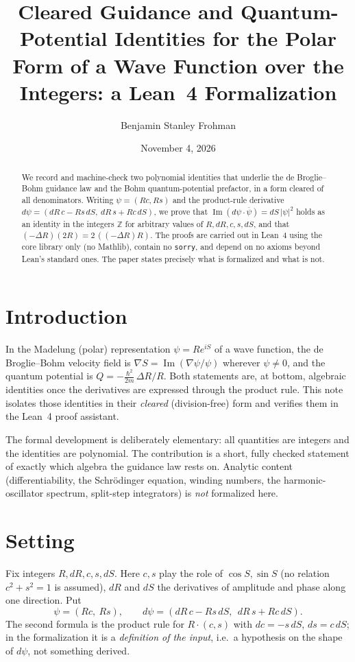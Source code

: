 \documentclass[11pt]{amsart}
\title[Cleared Madelung identities in Lean 4]{Cleared Guidance and Quantum-Potential Identities for the Polar Form of a Wave Function over the Integers: a Lean~4 Formalization}
\author{Benjamin Stanley Frohman}
\date{November 4, 2026}
\theoremstyle{definition}
\theoremstyle{remark}
\begin{document}
\begin{abstract}
We record and machine-check two polynomial identities that underlie the de Broglie--Bohm guidance law and the Bohm quantum-potential prefactor, in a form cleared of all denominators. Writing $\psi=(Rc,Rs)$ and the product-rule derivative $d\psi=(dR\,c-Rs\,dS,\ dR\,s+Rc\,dS)$, we prove that $\operatorname{Im}(d\psi\cdot\overline{\psi})=dS\,|\psi|^2$ holds as an identity in the integers $\mathbb{Z}$ for arbitrary values of $R,dR,c,s,dS$, and that $(-\Delta R)(2R)=2\,((-\Delta R)R)$. The proofs are carried out in Lean~4 using the core library only (no Mathlib), contain no \texttt{sorry}, and depend on no axioms beyond Lean's standard ones. The paper states precisely what is formalized and what is not.
\end{abstract}
\maketitle
{}\par


\section{Introduction}
In the Madelung (polar) representation $\psi=Re^{iS}$ of a wave function, the de Broglie--Bohm velocity field is $\nabla S=\operatorname{Im}(\nabla\psi/\psi)$ wherever $\psi\neq0$, and the quantum potential is $Q=-\tfrac{\hbar^2}{2m}\,\Delta R/R$. Both statements are, at bottom, algebraic identities once the derivatives are expressed through the product rule. This note isolates those identities in their \emph{cleared} (division-free) form and verifies them in the Lean~4 proof assistant.

The formal development is deliberately elementary: all quantities are integers and the identities are polynomial. The contribution is a short, fully checked statement of exactly which algebra the guidance law rests on. Analytic content (differentiability, the Schr\"odinger equation, winding numbers, the harmonic-oscillator spectrum, split-step integrators) is \emph{not} formalized here.

\section{Setting}
Fix integers $R,dR,c,s,dS$. Here $c,s$ play the role of $\cos S,\sin S$ (no relation $c^2+s^2=1$ is assumed), $dR$ and $dS$ the derivatives of amplitude and phase along one direction. Put
\[
\psi=(Rc,\ Rs),\qquad d\psi=(dR\,c-Rs\,dS,\ \ dR\,s+Rc\,dS).
\]
The second formula is the product rule for $R\cdot(c,s)$ with $dc=-s\,dS$, $ds=c\,dS$; in the formalization it is a \emph{definition of the input}, i.e.\ a hypothesis on the shape of $d\psi$, not something derived.
\end{document}
